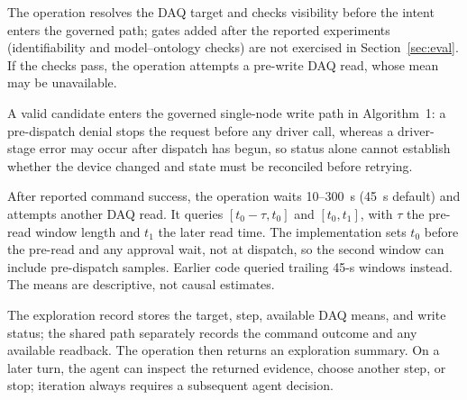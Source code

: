 The operation resolves the DAQ target and checks visibility before the intent enters the governed path; gates added after the reported experiments (identifiability and model--ontology checks) are not exercised in Section~\ref{sec:eval}. If the checks pass, the operation attempts a pre-write DAQ read, whose mean may be unavailable.

A valid candidate enters the governed single-node write path in Algorithm~1: a pre-dispatch denial stops the request before any driver call, whereas a driver-stage error may occur after dispatch has begun, so status alone cannot establish whether the device changed and state must be reconciled before retrying.

After reported command success, the operation waits 10--300~s (45~s default) and attempts another DAQ read. It queries $[t_0-\tau,t_0]$ and $[t_0,t_1]$, with $\tau$ the pre-read window length and $t_1$ the later read time. The implementation sets $t_0$ before the pre-read and any approval wait, not at dispatch, so the second window can include pre-dispatch samples. Earlier code queried trailing 45-s windows instead. The means are descriptive, not causal estimates.

The exploration record stores the target, step, available DAQ means, and write status; the shared path separately records the command outcome and any available readback. The operation then returns an exploration summary. On a later turn, the agent can inspect the returned evidence, choose another step, or stop; iteration always requires a subsequent agent decision.


